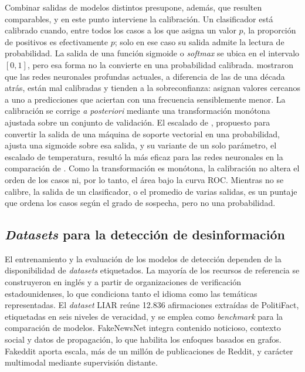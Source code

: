 Combinar salidas de modelos distintos presupone, además, que resulten comparables, y en este punto interviene la calibración. Un clasificador está calibrado cuando, entre todos los casos a los que asigna un valor $p$, la proporción de positivos es efectivamente $p$; solo en ese caso su salida admite la lectura de probabilidad. La salida de una función sigmoide o \textit{softmax} se ubica en el intervalo $[0,1]$, pero esa forma no la convierte en una probabilidad calibrada. \textcite{GuoEtAl2017} mostraron que las redes neuronales profundas actuales, a diferencia de las de una década atrás, están mal calibradas y tienden a la sobreconfianza: asignan valores cercanos a uno a predicciones que aciertan con una frecuencia sensiblemente menor. La calibración se corrige \textit{a posteriori} mediante una transformación monótona ajustada sobre un conjunto de validación. El escalado de \textcite{Platt1999}, propuesto para convertir la salida de una máquina de soporte vectorial en una probabilidad, ajusta una sigmoide sobre esa salida, y su variante de un solo parámetro, el escalado de temperatura, resultó la más eficaz para las redes neuronales en la comparación de \textcite{GuoEtAl2017}. Como la transformación es monótona, la calibración no altera el orden de los casos ni, por lo tanto, el área bajo la curva ROC. Mientras no se calibre, la salida de un clasificador, o el promedio de varias salidas, es un puntaje que ordena los casos según el grado de sospecha, pero no una probabilidad.

\subsection{\textit{Datasets} para la detección de desinformación}

El entrenamiento y la evaluación de los modelos de detección dependen de la disponibilidad de \textit{datasets} etiquetados. La mayoría de los recursos de referencia se construyeron en inglés y a partir de organizaciones de verificación estadounidenses, lo que condiciona tanto el idioma como las temáticas representadas. El \textit{dataset} LIAR \parencite{Wang2017} reúne 12.836 afirmaciones extraídas de PolitiFact, etiquetadas en seis niveles de veracidad, y se emplea como \textit{benchmark} para la comparación de modelos. FakeNewsNet \parencite{ShuEtAl2020} integra contenido noticioso, contexto social y datos de propagación, lo que habilita los enfoques basados en grafos. Fakeddit \parencite{NakamuraEtAl2020} aporta escala, más de un millón de publicaciones de Reddit, y carácter multimodal mediante supervisión distante.

